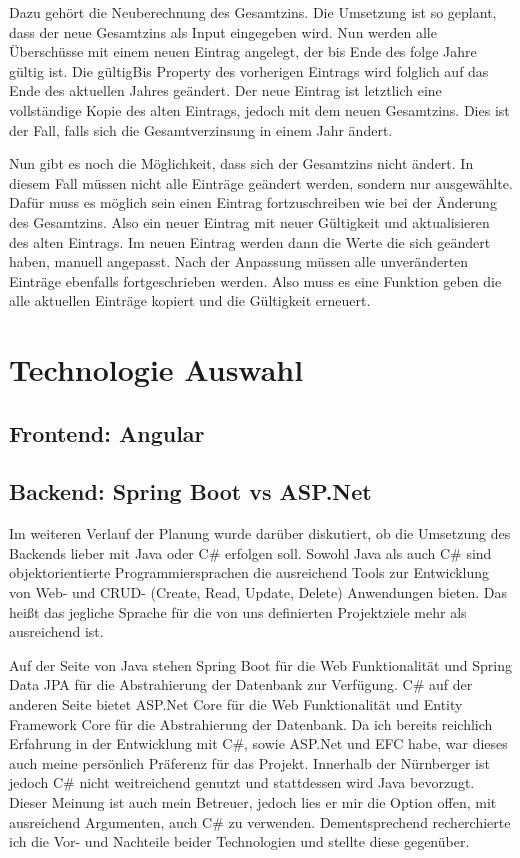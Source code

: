Dazu gehört die Neuberechnung des Gesamtzins. Die Umsetzung ist so geplant, dass der neue Gesamtzins als Input eingegeben wird.
Nun werden alle Überschüsse mit einem neuen Eintrag angelegt, der bis Ende des folge Jahre gültig ist. Die gültigBis Property des vorherigen Eintrags wird folglich auf das Ende des aktuellen Jahres geändert.
Der neue Eintrag ist letztlich eine vollständige Kopie des alten Eintrags, jedoch mit dem neuen Gesamtzins. Dies ist der Fall, falls sich die Gesamtverzinsung in einem Jahr ändert.

Nun gibt es noch die Möglichkeit, dass sich der Gesamtzins nicht ändert. In diesem Fall müssen nicht alle Einträge geändert werden, sondern nur ausgewählte. 
Dafür muss es möglich sein einen Eintrag fortzuschreiben wie bei der Änderung des Gesamtzins. Also ein neuer Eintrag mit neuer Gültigkeit und aktualisieren des alten Eintrags.
Im neuen Eintrag werden dann die Werte die sich geändert haben, manuell angepasst. Nach der Anpassung müssen alle unveränderten Einträge ebenfalls fortgeschrieben werden. 
Also muss es eine Funktion geben die alle aktuellen Einträge kopiert und die Gültigkeit erneuert.


\section{Technologie Auswahl}
\subsection{Frontend: Angular}
\subsection{Backend: Spring Boot vs ASP.Net}
Im weiteren Verlauf der Planung wurde darüber diskutiert, ob die Umsetzung des Backends lieber mit Java oder C\# erfolgen soll. 
Sowohl Java als auch C\# sind objektorientierte Programmiersprachen die ausreichend Tools zur Entwicklung von Web- und CRUD- (Create, Read, Update, Delete) Anwendungen bieten.
Das heißt das jegliche Sprache für die von uns definierten Projektziele mehr als ausreichend ist.

Auf der Seite von Java stehen Spring Boot für die Web Funktionalität und Spring Data JPA für die Abstrahierung der Datenbank zur Verfügung.
C\# auf der anderen Seite bietet ASP.Net Core für die Web Funktionalität und Entity Framework Core für die Abstrahierung der Datenbank.
Da ich bereits reichlich Erfahrung in der Entwicklung mit C\#, sowie ASP.Net und EFC habe, war dieses auch meine persönlich Präferenz für das Projekt.
Innerhalb der Nürnberger ist jedoch C\# nicht weitreichend genutzt und stattdessen wird Java bevorzugt. Dieser Meinung ist auch mein Betreuer, jedoch lies er mir die Option offen, mit 
ausreichend Argumenten, auch C\# zu verwenden. 
Dementsprechend recherchierte ich die Vor- und Nachteile beider Technologien und stellte diese gegenüber.

